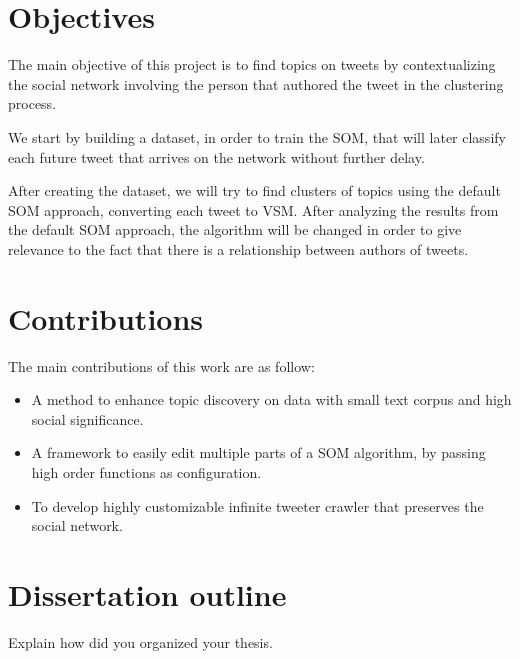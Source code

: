 \section{Objectives}
The main objective of this project is to find topics on tweets by contextualizing the social network involving the person that authored the tweet in the clustering process.

We start by building a dataset, in order to train the \ac{SOM}, that will later classify each future tweet that arrives on the network without further delay.

After creating the dataset, we will try to find clusters of topics using the default \ac{SOM} approach, converting each tweet to \ac{VSM}. After analyzing the results from the default \ac{SOM} approach, the algorithm will be changed in order to give relevance to the fact that there is a relationship between authors of tweets.

\section{Contributions}
The main contributions of this work are as follow:
\begin{itemize}
  \item A method to enhance topic discovery on data with small text corpus and high social significance.
  \item A framework to easily edit multiple parts of a \ac{SOM} algorithm, by passing high order functions as configuration.
  \item To develop highly customizable infinite tweeter crawler that preserves the social network.  
\end{itemize}

\section{Dissertation outline}
Explain how did you organized your thesis.

\cleardoublepage 
